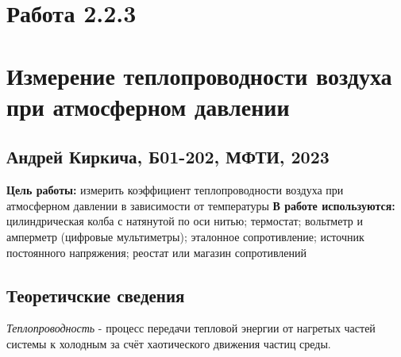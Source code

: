


	\section*{Работа 2.2.3}	
	\section*{Измерение теплопроводности воздуха при атмосферном давлении}
	\subsection*{Андрей Киркича, Б01-202, МФТИ, 2023}
	\n
	\textbf{Цель работы: }
измерить коэффициент теплопроводности воздуха при атмосферном давлении в зависимости от температуры
	\n\n
	\textbf{В работе используются: }
цилиндрическая колба с натянутой по оси нитью; термостат; вольтметр и амперметр (цифровые мультиметры); эталонное сопротивление; источник постоянного напряжения; реостат или магазин сопротивлений
	\n\n
	\subsection*{Теоретичские сведения}
	\textit{Теплопроводность} - процесс передачи тепловой энергии от нагретых частей системы к холодным за счёт хаотического движения частиц среды.\n\n
	\beb{\vec{q} = -\kappa \x \vec{\nabla} T}
	\n
	\n
